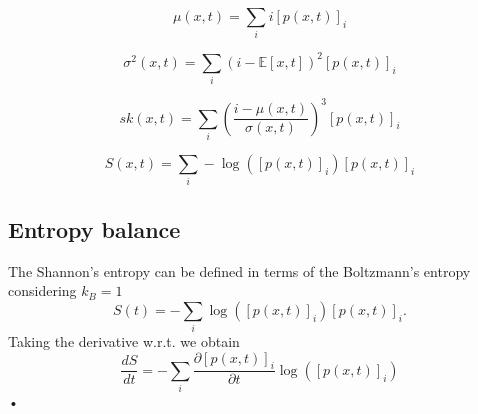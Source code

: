 \documentclass[conference]{IEEEtran}
\begin{document}
\begin{equation}
\mu(x,t) = \sum_i i [p(x,t)]_i
\end{equation}

\begin{equation}
\sigma^2(x,t) = \sum_i (i - \mathbb{E}[x,t])^2 [p(x,t)]_i
\end{equation}

\begin{equation}
sk(x,t) = \sum_i \left(\frac{i - \mu(x,t)}{\sigma(x,t)}\right)^3 [p(x,t)]_i
\end{equation}

\begin{equation}
S(x,t) = \sum_i -\log([p(x,t)]_i) [p(x,t)]_i
\end{equation}

\subsection{Entropy balance}
The Shannon's entropy can be defined in terms of the Boltzmann's entropy considering $k_B = 1$
%
\begin{equation}
S(t) = - \sum_i \log([p(x,t)]_i)[p(x,t)]_i.
\end{equation}
%
Taking the derivative w.r.t. we obtain
%
\begin{equation}
\frac{dS}{dt} = - \sum_i \frac{\partial [p(x,t)]_i}{\partial t} \log([p(x,t)]_i)
\end{equation}•
\end{document}
